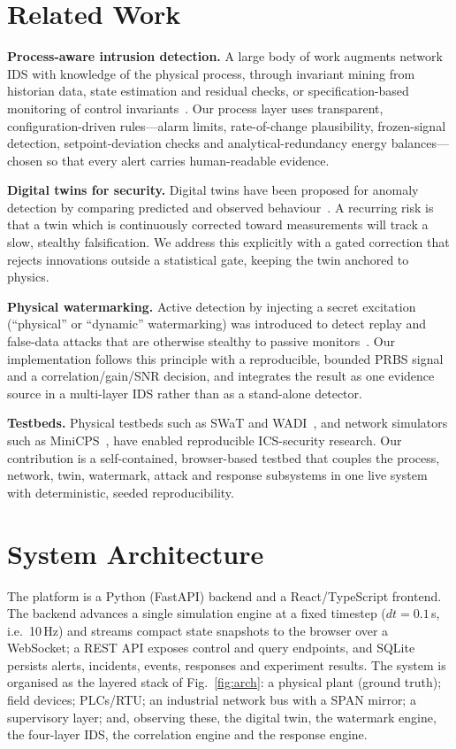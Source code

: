\documentclass[conference]{IEEEtran}
\begin{document}
\section{Related Work}
\textbf{Process-aware intrusion detection.} A large body of work augments network IDS with knowledge of the physical process, through invariant mining from historian data, state estimation and residual checks, or specification-based monitoring of control invariants~\cite{cardenas,urbina}. Our process layer uses transparent, configuration-driven rules---alarm limits, rate-of-change plausibility, frozen-signal detection, setpoint-deviation checks and analytical-redundancy energy balances---chosen so that every alert carries human-readable evidence.

\textbf{Digital twins for security.} Digital twins have been proposed for anomaly detection by comparing predicted and observed behaviour~\cite{eckhart}. A recurring risk is that a twin which is continuously corrected toward measurements will track a slow, stealthy falsification. We address this explicitly with a gated correction that rejects innovations outside a statistical gate, keeping the twin anchored to physics.

\textbf{Physical watermarking.} Active detection by injecting a secret excitation (``physical'' or ``dynamic'' watermarking) was introduced to detect replay and false-data attacks that are otherwise stealthy to passive monitors~\cite{mo2009,mo2015}. Our implementation follows this principle with a reproducible, bounded PRBS signal and a correlation/gain/SNR decision, and integrates the result as one evidence source in a multi-layer IDS rather than as a stand-alone detector.

\textbf{Testbeds.} Physical testbeds such as SWaT and WADI~\cite{swat}, and network simulators such as MiniCPS~\cite{minicps}, have enabled reproducible ICS-security research. Our contribution is a self-contained, browser-based testbed that couples the process, network, twin, watermark, attack and response subsystems in one live system with deterministic, seeded reproducibility.

\section{System Architecture}
The platform is a Python (FastAPI) backend and a React/TypeScript frontend. The backend advances a single simulation engine at a fixed timestep ($dt=0.1$\,s, i.e.\ 10\,Hz) and streams compact state snapshots to the browser over a WebSocket; a REST API exposes control and query endpoints, and SQLite persists alerts, incidents, events, responses and experiment results. The system is organised as the layered stack of Fig.~\ref{fig:arch}: a physical plant (ground truth); field devices; PLCs/RTU; an industrial network bus with a SPAN mirror; a supervisory layer; and, observing these, the digital twin, the watermark engine, the four-layer IDS, the correlation engine and the response engine.
\end{document}
